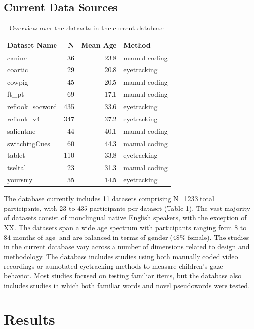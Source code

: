 \documentclass[10pt, letterpaper]{article}
\begin{document}
\hypertarget{current-data-sources}{%
\subsection{Current Data Sources}\label{current-data-sources}}

\begin{table}[H]
\centering
\begingroup\fontsize{9pt}{10pt}\selectfont
\begin{tabular}{lrrl}
  \hline
Dataset Name & N & Mean Age & Method \\ 
  \hline
canine & 36 & 23.8 & manual coding \\ 
  coartic & 29 & 20.8 & eyetracking \\ 
  cowpig & 45 & 20.5 & manual coding \\ 
  ft\_pt & 69 & 17.1 & manual coding \\ 
  reflook\_socword & 435 & 33.6 & eyetracking \\ 
  reflook\_v4 & 347 & 37.2 & eyetracking \\ 
  salientme & 44 & 40.1 & manual coding \\ 
  switchingCues & 60 & 44.3 & manual coding \\ 
  tablet & 110 & 33.8 & eyetracking \\ 
  tseltal & 23 & 31.3 & manual coding \\ 
  yoursmy & 35 & 14.5 & eyetracking \\ 
   \hline
\end{tabular}
\endgroup
\caption{Overview over the datasets in the current database.} 
\end{table}

The database currently includes 11 datasets comprising N=1233 total
participants, with 23 to 435 participants per dataset (Table 1). The
vast majority of datasets consist of monolingual native English
speakers, with the exception of XX. The datasets span a wide age
spectrum with participants ranging from 8 to 84 months of age, and are
balanced in terms of gender (48\% female). The studies in the current
database vary across a number of dimensions related to design and
methodology. The database includes studies using both manually coded
video recordings or aumotated eyetracking methods to measure children's
gaze behavior. Most studies focused on testing familiar items, but the
database also includes studies in which both familiar words and novel
pseudowords were tested.

\hypertarget{results}{%
\section{Results}\label{results}}
\end{document}
